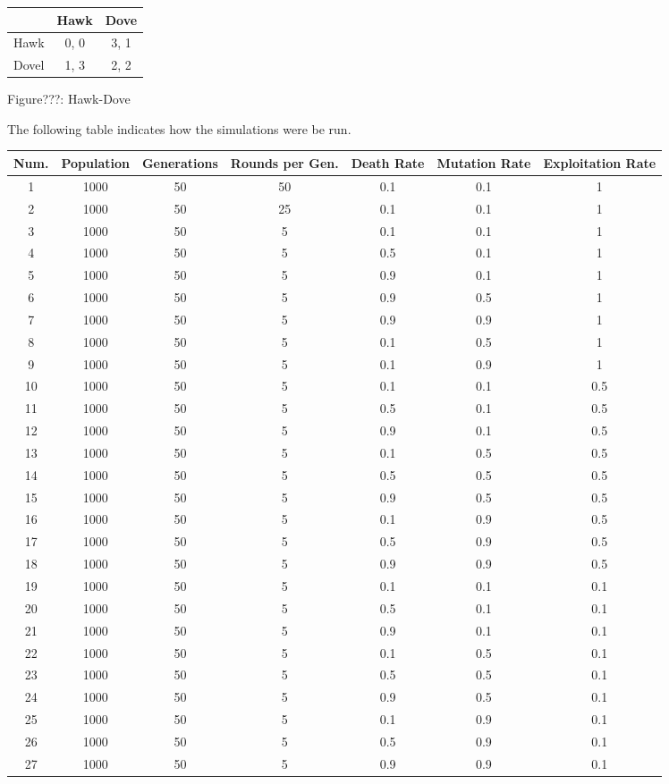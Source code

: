 \documentclass{article}
\begin{document}
\begin{center}
\begin{tabular}{|l|c|c|}
\hline
 & Hawk & Dove \\ 
\hline
Hawk & 0, 0 & 3, 1\\
\hline
 Dovel & 1, 3 & 2, 2\\
\hline
\end{tabular}
\end{center}
\begin{center}
	Figure???: Hawk-Dove
\end{center}


The following table indicates how the simulations were be run.
\begin{center}
\begin{tabular}{|c|c|c|c|c|c|c|}
\hline
Num. & Population & Generations& Rounds per Gen. & Death Rate & Mutation Rate & Exploitation Rate\\ 
\hline
1& 1000 & 50 & 50 & 0.1 & 0.1 & 1\\
\hline
2& 1000 & 50 & 25 & 0.1 & 0.1 & 1\\
\hline
3& 1000 & 50 & 5 & 0.1 & 0.1 & 1\\
\hline
4& 1000 & 50 & 5 & 0.5 & 0.1 & 1\\
\hline
5& 1000 & 50 & 5 & 0.9 & 0.1 & 1\\
\hline
6& 1000 & 50 & 5 & 0.9 & 0.5 & 1\\
\hline
7& 1000 & 50 & 5 & 0.9 & 0.9 & 1\\
\hline
8& 1000 & 50 & 5 & 0.1 & 0.5 & 1\\
\hline
9& 1000 & 50 & 5 & 0.1 & 0.9 & 1\\
\hline
10& 1000 & 50 & 5 & 0.1 & 0.1 & 0.5\\
\hline
11& 1000 & 50 & 5 & 0.5 & 0.1 & 0.5\\
\hline
12& 1000 & 50 & 5 & 0.9 & 0.1 & 0.5\\
\hline
13& 1000 & 50 & 5 & 0.1 & 0.5 & 0.5\\
\hline
14& 1000 & 50 & 5 & 0.5 & 0.5 & 0.5\\
\hline
15& 1000 & 50 & 5 & 0.9 & 0.5 & 0.5\\
\hline
16& 1000 & 50 & 5 & 0.1 & 0.9 & 0.5\\
\hline
17& 1000 & 50 & 5 & 0.5 & 0.9 & 0.5\\
\hline
18& 1000 & 50 & 5 & 0.9 & 0.9 & 0.5\\
\hline
19& 1000 & 50 & 5 & 0.1 & 0.1 & 0.1\\
\hline
20& 1000 & 50 & 5 & 0.5 & 0.1 & 0.1\\
\hline
21& 1000 & 50 & 5 & 0.9 & 0.1 & 0.1\\
\hline
22& 1000 & 50 & 5 & 0.1 & 0.5 & 0.1\\
\hline
23& 1000 & 50 & 5 & 0.5 & 0.5 & 0.1\\
\hline
24& 1000 & 50 & 5 & 0.9 & 0.5 & 0.1\\
\hline
25& 1000 & 50 & 5 & 0.1 & 0.9& 0.1\\
\hline
26& 1000 & 50 & 5 & 0.5 & 0.9 & 0.1\\
\hline
27& 1000 & 50 & 5 & 0.9 & 0.9 & 0.1\\
\hline
\end{tabular}
\end{center}
\end{document}
